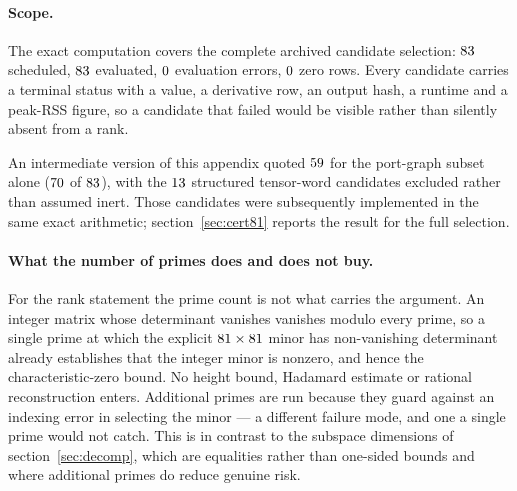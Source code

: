 \paragraph{Scope.} The exact computation covers the complete archived candidate
selection: $83$ scheduled, $83$ evaluated,
$0$ evaluation errors, $0$ zero rows. Every
candidate carries a terminal status with a value, a derivative row, an output
hash, a runtime and a peak-RSS figure, so a candidate that failed would be
visible rather than silently absent from a rank.

An intermediate version of this appendix quoted $59$ for the
port-graph subset alone ($70$ of $83$), with
the $13$ structured tensor-word candidates excluded rather than
assumed inert. Those candidates were subsequently implemented in the same exact
arithmetic; section~\ref{sec:cert81} reports the result for the full selection.

\paragraph{What the number of primes does and does not buy.} For the rank
statement the prime count is not what carries the argument. An integer matrix
whose determinant vanishes vanishes modulo every prime, so a single prime at
which the explicit $81\times81$ minor has non-vanishing
determinant already establishes that the integer minor is nonzero, and hence the
characteristic-zero bound. No height bound, Hadamard estimate or rational
reconstruction enters. Additional primes are run because they guard against an
indexing error in selecting the minor --- a different failure mode, and one a
single prime would not catch. This is in contrast to the subspace dimensions of
section~\ref{sec:decomp}, which are equalities rather than one-sided bounds and
where additional primes do reduce genuine risk.
